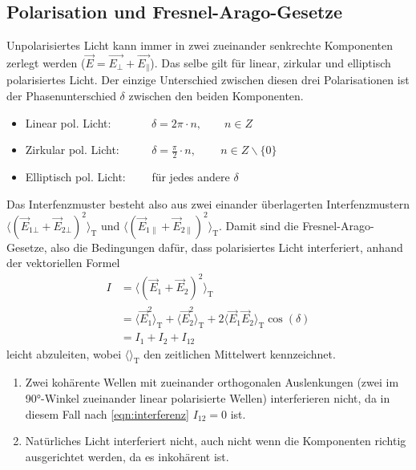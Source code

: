     \subsection{Polarisation und Fresnel-Arago-Gesetze}
        Unpolarisiertes Licht kann immer in zwei zueinander senkrechte Komponenten zerlegt werden ($\vec{E} = \vec{E_{\bot}} + \vec{E_{\parallel}}$). Das selbe gilt für linear, zirkular und elliptisch polarisiertes Licht. Der einzige Unterschied zwischen diesen drei Polarisationen ist der Phasenunterschied $\delta$ zwischen den beiden Komponenten.
        \begin{itemize}
            \item Linear pol. Licht: $\qquad \quad \; \delta = 2\pi \cdot n, \qquad n \in Z$
            \item Zirkular pol. Licht: $\qquad \; \; \delta = \frac{\pi}{2} \cdot n, \qquad \, n \in Z \backslash \{0\}$
            \item Elliptisch pol. Licht: $\qquad$für jedes andere $\delta$
        \end{itemize}
        Das Interfenzmuster besteht also aus zwei einander überlagerten Interfenzmustern $\langle\left(\vec{E}_{1\bot} + \vec{E}_{2\bot}\right)^2\rangle_{\text{T}}$ und $\langle\left(\vec{E}_{1\parallel} + \vec{E}_{2\parallel}\right)^2\rangle_{\text{T}}$.
        Damit sind die Fresnel-Arago-Gesetze, also die Bedingungen dafür, dass polarisiertes Licht interferiert, anhand der vektoriellen Formel
        \begin{align}
            I &= \langle\left(\vec{E}_1 + \vec{E}_2\right)^2\rangle_{\text{T}} \nonumber\\
            &= \langle\vec{E}^2_1\rangle_{\text{T}} + \langle\vec{E}^2_2\rangle_{\text{T}} + 2\langle\vec{E}_1\vec{E}_2\rangle_{\text{T}} \cos(\delta) \\
            &= I_1 + I_2 + I_{12}
            \label{eqn:interferenz}
        \end{align}
        leicht abzuleiten, wobei $\langle\rangle_{\text{T}}$ den zeitlichen Mittelwert kennzeichnet.
        \begin{enumerate}
            \item Zwei kohärente Wellen mit zueinander orthogonalen Auslenkungen (zwei im 90°-Winkel zueinander linear polarisierte Wellen) interferieren nicht, da in diesem Fall nach \eqref{eqn:interferenz} $I_{12} = 0$ ist.
            \item Natürliches Licht interferiert nicht, auch nicht wenn die Komponenten richtig ausgerichtet werden, da es inkohärent ist.
        \end{enumerate}
    
